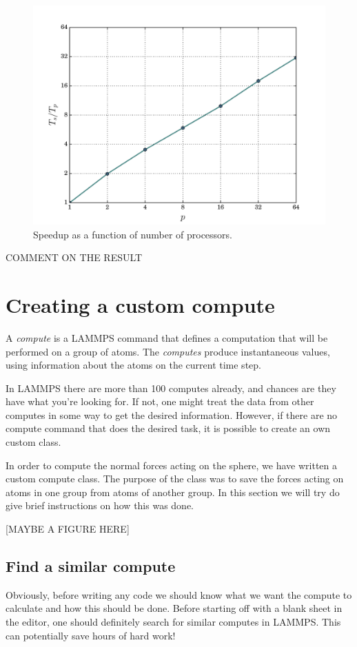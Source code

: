 \documentclass[twoside,english]{uiofysmaster}
\begin{document}
\begin{figure}[H]
\centering
\includegraphics[width=0.7\linewidth]{figures/speedup/15x15.pdf}
\caption{Speedup as a function of number of processors.}
\label{fig:speedup15x15}
\end{figure}

{\large {\color{editColor}COMMENT ON THE RESULT}}

 
\section{Creating a custom compute}
A \textit{compute} is a LAMMPS command that defines a computation that will be performed on a group of atoms. The \textit{computes} produce instantaneous values, using information about the atoms on the current time step. 

In LAMMPS there are more than 100 computes already, and chances are they have what you're looking for. If not, one might treat the data from other computes in some way to get the desired information. However, if there are no compute command that does the desired task, it is possible to create an own custom class.  

In order to compute the normal forces acting on the sphere, we have written a custom compute class. The purpose of the class was to save the forces acting on atoms in one group from atoms of another group. In this section we will try do give brief instructions on how this was done.

[MAYBE A FIGURE HERE]

\subsection{Find a similar compute}
Obviously, before writing any code we should know what we want the compute to calculate and how this should be done. 
Before starting off with a blank sheet in the editor, one should definitely search for similar computes in LAMMPS. This can potentially save hours of hard work!
\end{document}
